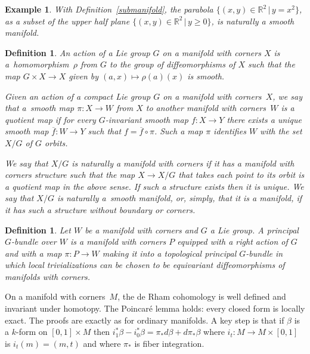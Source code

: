 \documentclass[10pt,a4paper]{amsart}
\numberwithin{equation}{section}
\newtheorem{Definition}[Lemma]{Definition}
\newtheorem{Example}[Lemma]{Example}
\begin{document}
\begin{Example}
  With Def\/inition~\ref{submanifold}, the parabola $\{(x,y)\in {\mathbb R}^2
  \,|\, y = x^2 \}$, as a subset of the upper half plane $\{(x,y)\in
  {\mathbb R}^2 \,|\, y \geq 0 \}$, is naturally a smooth manifold.
\end{Example}

\begin{Definition} \label{quotient}
  An \emph{action} of a Lie group $G$ on a manifold with corners $X$
  is a~homomor\-phism~$\rho$ from $G$ to the group of dif\/feomorphisms of
  $X$ such that the map $G \times X \to X$ given by $(a,x) \mapsto
  \rho(a)(x)$ is smooth.

  Given an action of a compact Lie group $G$ on a manifold with corners~$X$,
  we say that a~smooth
  map $\pi \colon X \to W$ from $X$ to another manifold with corners~$W$ is \emph{a quotient map} if for every $G$-invariant smooth map
  $f \colon X \to Y$ there exists a unique smooth map $\overline{f} \colon W
  \to Y$ such that $f = \overline{f} \circ \pi$.
  Such a map $\pi$ identif\/ies $W$ with the set $X/G$ of $G$ orbits.

  We say that $X/G$ is \emph{naturally a manifold with corners}
  if it has a manifold with corners structure such that the map $X \to X/G$
  that takes each point to its orbit is a quotient map in the above sense.
  If such a structure exists then it is unique.  We say that $X/G$
  is \emph{naturally a~smooth manifold}, or, simply, that it is a manifold,
  if it has such a structure without boundary or corners.
\end{Definition}

\begin{Definition}\label{def:pric_G-bundle_corners}
  Let $W$ be a manifold with corners and $G$ a Lie group.
  A \emph{principal $G$-bundle} over $W$ is a manifold with corners $P$
  equipped with a right action of $G$ and with a map $\pi\colon P\to W$
  making it into a topological principal $G$-bundle
  in which local trivializations can be chosen to be equivariant
  dif\/feomorphisms of manifolds with corners.
\end{Definition}

On a manifold with corners~$M$, the de Rham cohomology
is well def\/ined and invariant under homotopy.
The Poincar\'e lemma holds: every closed form is locally exact.
The proofs are exactly as for ordinary manifolds.
A key step is that if $\beta$ is a $k$-form on $[0,1] \times M$
then $i_1^* \beta - i_0^* \beta = \pi_* d\beta + d \pi_* \beta$
where $i_t \colon M \to M \times [0,1]$ is $i_t(m) = (m,t)$
and where $\pi_*$ is f\/iber integration.
\end{document}

